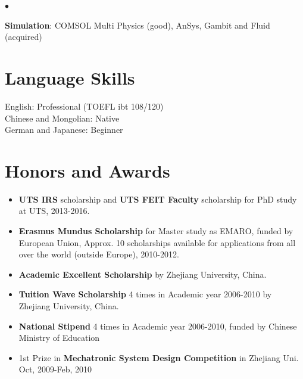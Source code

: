 \documentclass[margin,line]{res}
\newenvironment{list2}{
  \begin{list}{$\bullet$}{%
      \setlength{\itemsep}{0in}
      \setlength{\parsep}{0in} \setlength{\parskip}{0in}
      \setlength{\topsep}{0in} \setlength{\partopsep}{0in} 
      \setlength{\leftmargin}{0.2in}}}{\end{list}}
\begin{document}
\begin{resume}
\begin{list2}
\item {\bf Simulation}: COMSOL Multi Physics (good), AnSys, Gambit and Fluid (acquired) \\
\end{list2}




\section{\sc Language Skills} 
English: Professional (TOEFL ibt 108/120)\\
Chinese and Mongolian: Native\\
German and Japanese: Beginner

\section{\sc Honors and Awards} 
\begin{itemize}


\item {\bf UTS IRS} %
scholarship and {\bf UTS FEIT Faculty} scholarship for PhD study at UTS, 2013-2016.

%
\vspace*{-2.5mm}
\item {\bf Erasmus Mundus Scholarship} for Master study as EMARO, funded by European Union, Approx. 10 scholarships available for applications from all over the world (outside Europe), 2010-2012.

\vspace*{-2.5mm}
\item {\bf Academic Excellent Scholarship} by Zhejiang University, China.

\vspace*{-2.5mm}
\item {\bf Tuition Wave Scholarship} 4 times in Academic year 2006-2010 by Zhejiang University, China.

\vspace*{-2.5mm}
\item {\bf National Stipend} 4 times in Academic year 2006-2010, funded by Chinese Ministry of Education

\vspace*{-2.5mm}
\item 1st Prize in {\bf Mechatronic System Design Competition} in Zhejiang Uni. Oct, 2009-Feb, 2010


\end{itemize}
\end{resume}
\end{document}
